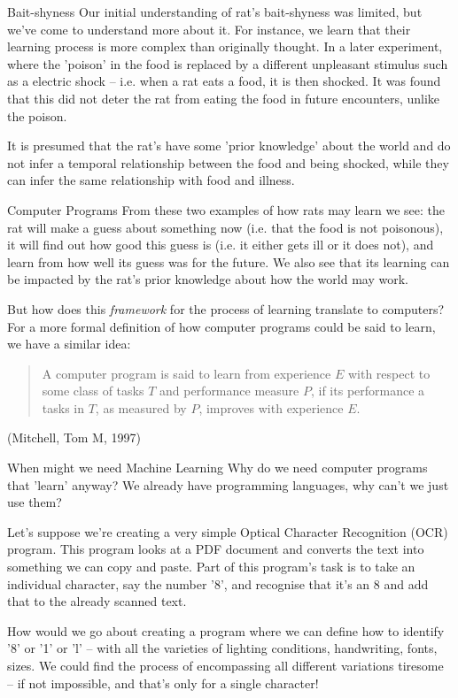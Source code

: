 \documentclass[10pt]{beamer}
\begin{document}
\begin{frame}[label={sec:org15c74c0}]{Bait-shyness}
Our initial understanding of rat's bait-shyness was limited, but we've come to
understand more about it. For instance, we learn that their learning process is more
complex than originally thought. In a later experiment, where the 'poison' in the
food is replaced by a different unpleasant stimulus such as a electric shock --
i.e. when a rat eats a food, it is then shocked. It was found that this did not
deter the rat from eating the food in future encounters, unlike the poison.

It is presumed that the rat's have some 'prior knowledge' about the world and do not
infer a temporal relationship between the food and being shocked, while they can
infer the same relationship with food and illness.
\end{frame}

\begin{frame}[label={sec:org82f360e}]{Computer Programs}
From these two examples of how rats may learn we see: the rat will make a guess about
something now (i.e. that the food is not poisonous), it will find out how good this
guess is (i.e. it either gets ill or it does not), and learn from how well its guess
was for the future. We also see that its learning can be impacted by the rat's prior
knowledge about how the world may work.

But how does this \emph{framework} for the process of learning translate to computers? For a
more formal definition of how computer programs could be said to learn, we have a
similar idea:

\begin{quote}
A computer program is said to learn from experience \(E\) with respect
to some class of tasks \(T\) and performance measure \(P\), if its performance
a tasks in \(T\), as measured by \(P\), improves with experience \(E\).
\end{quote}

(Mitchell, Tom M, 1997)
\end{frame}

\begin{frame}[label={sec:org6a5b143}]{When might we need Machine Learning}
Why do we need computer programs that 'learn' anyway? We already have programming
languages, why can't we just use them?

Let's suppose we're creating a very simple Optical Character Recognition (OCR)
program. This program looks at a PDF document and converts the text into something we
can copy and paste. Part of this program's task is to take an individual character,
say the number '8', and recognise that it's an 8 and add that to the already scanned
text.

How would we go about creating a program where we can define how to identify '8' or
'1' or 'l' -- with all the varieties of lighting conditions, handwriting, fonts,
sizes. We could find the process of encompassing all different variations tiresome --
if not impossible, and that's only for a single character!
\end{frame}
\end{document}
